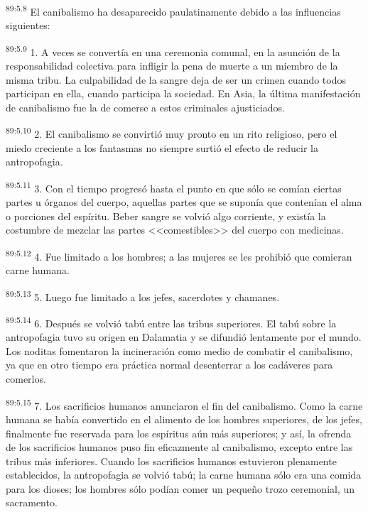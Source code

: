 \documentclass[twoside, 11pt]{book}
\begin{document}
\par
\textsuperscript{89:5.8} El canibalismo ha desaparecido paulatinamente debido a las influencias siguientes:

\par
\textsuperscript{89:5.9} 1. A veces se convertía en una ceremonia comunal, en la asunción de la responsabilidad colectiva para infligir la pena de muerte a un miembro de la misma tribu. La culpabilidad de la sangre deja de ser un crimen cuando todos participan en ella, cuando participa la sociedad. En Asia, la última manifestación de canibalismo fue la de comerse a estos criminales ajusticiados.

\par
\textsuperscript{89:5.10} 2. El canibalismo se convirtió muy pronto en un rito religioso, pero el miedo creciente a los fantasmas no siempre surtió el efecto de reducir la antropofagia.

\par
\textsuperscript{89:5.11} 3. Con el tiempo progresó hasta el punto en que sólo se comían ciertas partes u órganos del cuerpo, aquellas partes que se suponía que contenían el alma o porciones del espíritu. Beber sangre se volvió algo corriente, y existía la costumbre de mezclar las partes <<comestibles>> del cuerpo con medicinas.

\par
\textsuperscript{89:5.12} 4. Fue limitado a los hombres; a las mujeres se les prohibió que comieran carne humana.

\par
\textsuperscript{89:5.13} 5. Luego fue limitado a los jefes, sacerdotes y chamanes.

\par
\textsuperscript{89:5.14} 6. Después se volvió tabú entre las tribus superiores. El tabú sobre la antropofagia tuvo su origen en Dalamatia y se difundió lentamente por el mundo. Los noditas fomentaron la incineración como medio de combatir el canibalismo, ya que en otro tiempo era práctica normal desenterrar a los cadáveres para comerlos.

\par
\textsuperscript{89:5.15} 7. Los sacrificios humanos anunciaron el fin del canibalismo. Como la carne humana se había convertido en el alimento de los hombres superiores, de los jefes, finalmente fue reservada para los espíritus aún más superiores; y así, la ofrenda de los sacrificios humanos puso fin eficazmente al canibalismo, excepto entre las tribus más inferiores. Cuando los sacrificios humanos estuvieron plenamente establecidos, la antropofagia se volvió tabú; la carne humana sólo era una comida para los dioses; los hombres sólo podían comer un pequeño trozo ceremonial, un sacramento.
\end{document}
